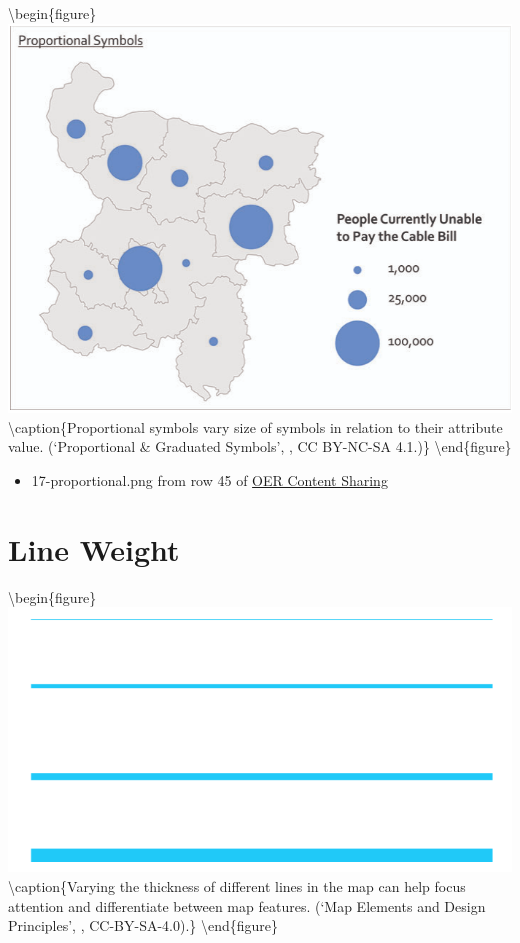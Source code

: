 \documentclass[
]{book}
\providecommand{\tightlist}{%
  \setlength{\itemsep}{0pt}\setlength{\parskip}{0pt}}
\begin{document}
\textbackslash begin\{figure\}
\includegraphics[width=0.8\linewidth]{images/17-proportional} \textbackslash caption\{Proportional symbols vary size of symbols in relation to their attribute value. (`Proportional \& Graduated Symbols', \citet{robinson_layout_2020}, CC BY-NC-SA 4.1.)\}\label{fig:17-proportional}
\textbackslash end\{figure\}

\begin{itemize}
\tightlist
\item
  17-proportional.png from row 45 of \href{https://docs.google.com/spreadsheets/d/1LqzXn00wMeIjHWstNT3tMImNDZirLGc3g72jFOQc_8I/edit\#gid=817407192}{OER Content Sharing}
\end{itemize}

\hypertarget{line-weight}{%
\section{Line Weight}\label{line-weight}}

\textbackslash begin\{figure\}
\includegraphics[width=0.8\linewidth]{images/17-lineWeight} \textbackslash caption\{Varying the thickness of different lines in the map can help focus attention and differentiate between map features. (`Map Elements and Design Principles', \citet{ingram_map_2021}, CC-BY-SA-4.0).\}\label{fig:17-lineWeight}
\textbackslash end\{figure\}
\end{document}
